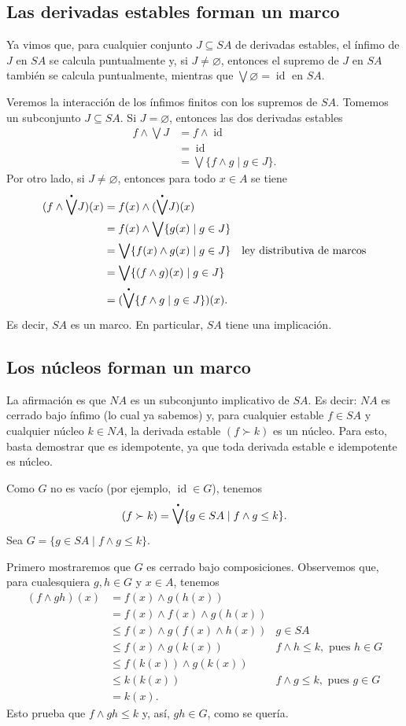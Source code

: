 \documentclass[12pt,letterpaper,titlepage]{article}
\let\emptyset\varnothing
\theoremstyle{definition}
\newcommand\Sup{\bigvee}
\renewcommand\inf{\wedge}
\newcommand\pSup{%
    {\stackrel{\raisebox{-3pt}{\scalebox{0.5}{$\bullet$}}}{\bigvee}}
  }%
\newcommand\<{\langle}
\renewcommand\>{\rangle}
\DeclareMathOperator{\id}{id}
\begin{document}
\subsection{Las derivadas estables forman un marco}

Ya vimos que, para cualquier conjunto $J\subseteq SA$ de
derivadas estables, el ínfimo de $J$ en $SA$ se calcula
puntualmente y, si $J\neq\emptyset$, entonces el supremo de $J$
en $SA$ también se calcula puntualmente, mientras que
$\Sup\emptyset=\id$ en $SA$.


Veremos la interacción de los ínfimos finitos con los supremos de
$SA$.
Tomemos un subconjunto $J\subseteq SA$.
Si $J=\emptyset$, entonces las dos derivadas estables
\begin{align*}
  f\inf \Sup J
  &= f\inf\id \\
  &= \id \\
  &= \Sup\{f\inf g \mid g\in J\}.
\end{align*}
Por otro lado, si $J\neq\emptyset$, entonces para todo $x\in A$
se tiene
\begin{align*}
  (f\inf \pSup J)(x)
  &= f(x)\inf (\pSup J)(x) \\
  &= f(x)\inf \Sup\{g(x) \mid g\in J\} \\
  &= \Sup\{f(x)\inf g(x) \mid g\in J\}
    & \text{ley distributiva de marcos} \\
  &= \Sup\{(f\inf g)(x) \mid g\in J\} \\
  &= (\pSup\{f\inf g \mid g\in J\})(x).
\end{align*}
Es decir, $SA$ es un marco.
En particular, $SA$ tiene una implicación.

\subsection{Los núcleos forman un marco}

La afirmación es que $NA$ es un subconjunto implicativo de $SA$.
Es decir: $NA$ es cerrado bajo ínfimo (lo cual ya sabemos) y,
para cualquier estable $f\in SA$ y cualquier núcleo $k\in NA$, la
derivada estable $(f\succ k)$ es un núcleo.
Para esto, basta demostrar que es idempotente, ya que toda
derivada estable e idempotente es núcleo.

Como $G$ no es vacío (por ejemplo, $\id\in G$), tenemos
\[
  (f\succ k) = \pSup\{g\in SA \mid f\inf g\leq k\}
.\]
Sea $G=\{g\in SA \mid f\inf g\leq k\}$.

Primero mostraremos que $G$ es cerrado bajo composiciones.
Observemos que, para cualesquiera $g,h\in G$ y $x\in A$, tenemos
\begin{align*}
  (f\inf gh)(x)
  &= f(x)\inf g(h(x)) \\
  &= f(x)\inf f(x) \inf g(h(x)) \\
  &\leq f(x) \inf g(f(x)\inf h(x))
    & g\in SA \\
  &\leq f(x) \inf g(k(x))
    & f\inf h \leq k, \text{ pues } h\in G \\
  &\leq f(k(x)) \inf g(k(x)) \\
  &\leq k(k(x))
    & f\inf g \leq k, \text{ pues } g\in G \\
  &= k(x).
\end{align*}
Esto prueba que $f\inf gh \leq k$ y, así, $gh\in G$, como se
quería.
\end{document}
